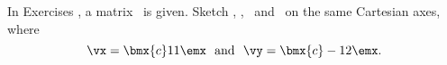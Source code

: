 {\noin In Exercises}
{, a matrix \tta\ is given. Sketch \vx, \vy, \tta\vx\ and \tta\vy\ on the same Cartesian axes, where
$$\vx = \bmx{c}1\\1\emx \ \text{ and } \ \vy=\bmx{c}-1\\2\emx.$$}
